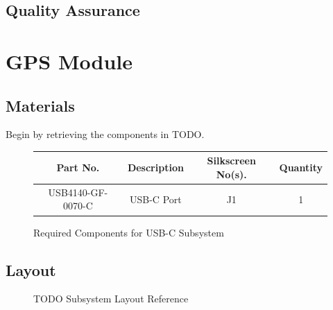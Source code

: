 \documentclass{article}
\begin{document}
\subsection{Quality Assurance}

\section{GPS Module}

\subsection{Materials}
Begin by retrieving the components in TODO.

\begin{figure}[H]
    \begin{center}
        \begin{tabular}{ c|c|c|c } 
            \textbf{Part No.} & \textbf{Description} & \textbf{Silkscreen No(s).} & \textbf{Quantity} \\ 
            \hline
            USB4140-GF-0070-C & USB-C Port & J1 & 1 \\ 
        \end{tabular}
    \end{center}
    \caption{Required Components for USB-C Subsystem}
    \label{tbl:TODO-materials}
\end{figure}

\subsection{Layout}

\begin{figure}[H]
    \centering
        \qquad
        \caption{TODO Subsystem Layout Reference}%
    \label{fig:TODO-layout}%
\end{figure}
\end{document}
